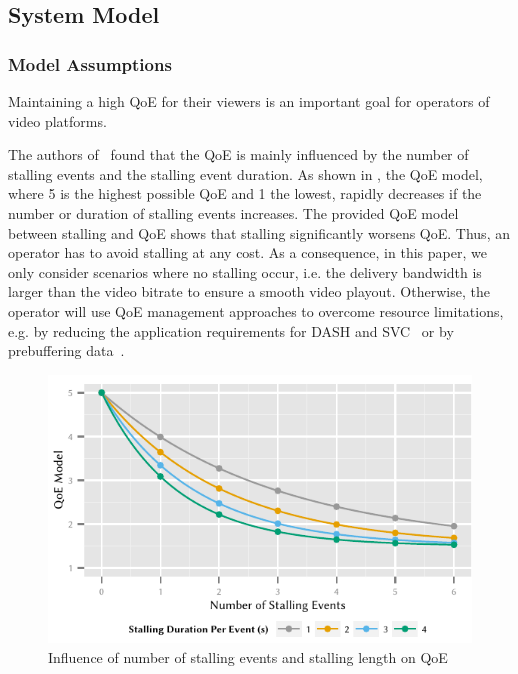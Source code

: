 \subsection{System Model}\label{sec:application:lte_video:system_model}

\subsubsection*{Model Assumptions}\label{sec:application:lte_video:system_model:model_assumptions}
Maintaining a high \gls{QoE} for their viewers is an important goal for operators of video platforms.

The authors of~\cite{Hossfeld2012a} found that the \gls{QoE} is mainly influenced by the number of stalling events and the stalling event duration.
As shown in , the \gls{QoE} model, where 5 is the highest possible \gls{QoE} and 1 the lowest, rapidly decreases if the number or duration of stalling events increases.
The provided \gls{QoE} model between stalling and \gls{QoE} shows that stalling significantly worsens \gls{QoE}.
Thus, an operator has to avoid stalling at any cost.
As a consequence, in this paper, we only consider scenarios where no stalling occur, i.e. the delivery bandwidth is larger than the video bitrate to ensure a smooth video playout.
Otherwise, the operator will use \gls{QoE} management approaches to overcome resource limitations, e.g. by reducing the application requirements for \gls{DASH} and \gls{SVC}~\cite{Hossfeld2012b} or by prebuffering data~\cite{Hossfeld2013b}.

\begin{figure}
  \includegraphics{application/lte_video/system_model/figures/stalling2qoe}
  \caption{Influence of number of stalling events and stalling length on \gls{QoE}~\cite{Hossfeld2012a}}
  \label{fig:application:lte_video:system_model:stalling2qoe}
\end{figure}

